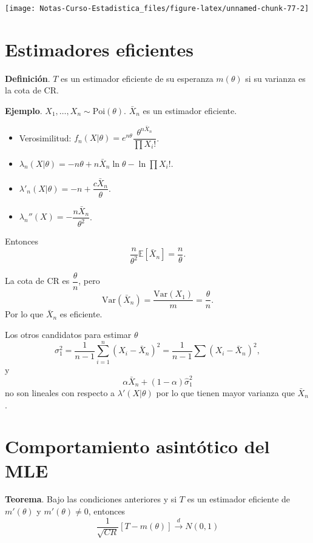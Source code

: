 \documentclass[
  12pt,
]{book}
\begin{document}
\begin{center}\texttt{[image: Notas-Curso-Estadistica\_files/figure-latex/unnamed-chunk-77-2]} \end{center}

\hypertarget{estimadores-eficientes}{%
\section{Estimadores eficientes}\label{estimadores-eficientes}}

\textbf{Definición}. \(T\) es un estimador eficiente de su esperanza \(m(\theta)\) si su varianza es la cota de CR.

\textbf{Ejemplo}. \(X_1,\dots, X_n\sim \text{Poi}(\theta)\). \(\bar X_n\) es un estimador eficiente.

\begin{itemize}
\item
  Verosimilitud: \(f_n(X|\theta) = e ^{n\theta}\dfrac{\theta^{n\bar X_n}}{\prod X_i!}\).
\item
  \(\lambda_n(X|\theta) = -n\theta + n\bar X_n \ln \theta - \ln \prod X_i!\).
\item
  \(\lambda'_n(X|\theta) = -n+\dfrac{c\bar X_n}{\theta}\).
\item
  \(\lambda_n''(X) = -\dfrac{n\bar X_n}{\theta^2}\).
\end{itemize}

Entonces
\[\dfrac{n}{\theta^2}\mathbb E[\bar X_n] = \dfrac n{\theta}.\]

La cota de CR es \(\dfrac \theta n\), pero
\[\text{Var}(\bar X_n) = \dfrac{\text{Var}(X_1)}{m} = \dfrac \theta n.\]
Por lo que \(\bar X_n\) es eficiente.

Los otros candidatos para estimar \(\theta\)
\[\sigma_1^2=\dfrac 1{n-1}\sum_{i=1}^{n}\left(X_{i}-\bar{X}_{n}\right)^{2} = \dfrac 1{n-1}\sum (X_i-\bar X_n)^2,\]
y
\[\alpha \bar X_n + (1-\alpha)\hat\sigma^2_1\]
no son lineales con respecto a \(\lambda'(X|\theta)\) por lo que tienen mayor varianza que \(\bar X_n\).

\hypertarget{comportamiento-asintuxf3tico-del-mle}{%
\section{Comportamiento asintótico del MLE}\label{comportamiento-asintuxf3tico-del-mle}}

\textbf{Teorema}. Bajo las condiciones anteriores y si \(T\) es un estimador eficiente de \(m'(\theta)\) y \(m'(\theta) \neq 0\), entonces
\[\dfrac 1{\sqrt{CR}}[T-m(\theta)]\xrightarrow{d}N(0,1)\]
\end{document}
